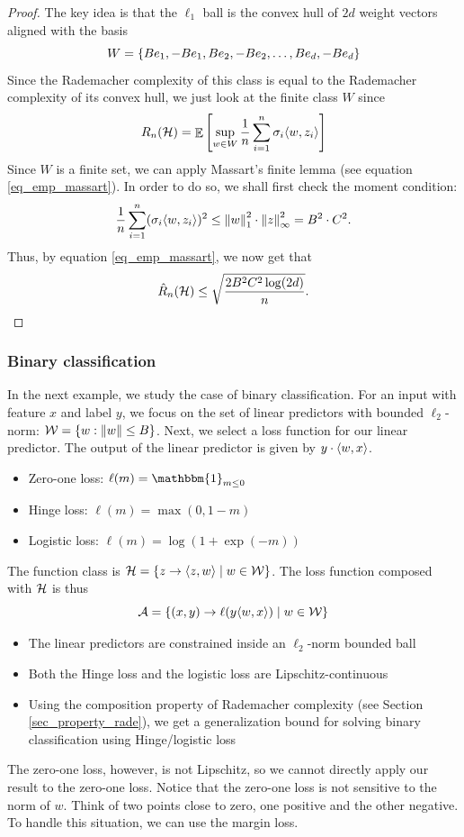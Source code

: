 \begin{proof}
The key idea is that the $\ell_1$ ball is the convex hull of $2d$ weight vectors aligned with the basis
\[ W = \left\{Be_1, -Be_1, Be_2, -Be_2, \dots, Be_d, -Be_d\right\} \]
Since the Rademacher complexity of this class is equal to the Rademacher complexity of its convex hull, we just look at the finite class $W$ since
\[ R_n(\mathcal{H}) = \mathop{\mathbb{E}}\left[ \sup_{w\in W} \frac 1 n \sum_{i=1}^n \sigma_i \langle w, z_i \rangle \right] \]
Since $W$ is a finite set, we can apply Massart's finite lemma (see equation \eqref{eq_emp_massart}).
In order to do so, we shall first check the moment condition:
\[ \frac 1 n \sum_{i=1}^n (\sigma_i \langle w, z_i \rangle)^2 \le \left\| w \right\|_1^2 \cdot \left\| z \right\|_{\infty}^2 = B^2 \cdot C^2. \]
Thus, by equation \eqref{eq_emp_massart}, we now get that
\[ \hat R_n(\mathcal{H}) \le \sqrt{\frac {2B^2 C^2 \log(2d)} n}. \]
\end{proof}

\iffalse
\subsubsection{Binary classification}

In the next example, we study the case of binary classification.
For an input with feature $x$ and label $y$, we focus on the set of linear predictors with bounded $\ell_2$-norm: $\mathcal{W} = \left\{w: \left\| w \right\| \le B\right\}$.
Next, we select a loss function for our linear predictor.
The output of the linear predictor is given by $y \cdot \langle w, x \rangle$.
\begin{itemize}
    \item Zero-one loss: $\ell(m) = \mathbbm{1}_{m \le 0}$

    \item Hinge loss: $\ell(m) = \max(0, 1 - m)$

    \item Logistic loss: $\ell(m) =  {\log(1 + \exp(-m)) }$ %
\end{itemize}
The function class is $\mathcal{H} = \left\{z \rightarrow \langle z, w \rangle \mid w \in\mathcal{W}\right\}$.
The loss function composed with $\mathcal{H}$ is thus
\[ \mathcal{A} = \left\{ (x, y) \rightarrow \ell(y \langle w, x \rangle) \mid w \in \mathcal{W}\right\} \]
\begin{itemize}
    \item The linear predictors are constrained inside an $\ell_2$-norm bounded ball

    \item Both the Hinge loss and the logistic loss are Lipschitz-continuous
    
    \item Using the composition property of Rademacher complexity (see Section \ref{sec_property_rade}), we get a generalization bound for solving binary classification using Hinge/logistic loss
\end{itemize}
The zero-one loss, however, is not Lipschitz, so we cannot directly apply our result to the zero-one loss.
Notice that the zero-one loss is not sensitive to the norm of $w$. Think of two points close to zero, one positive and the other negative.
To handle this situation, we can use the margin loss.

